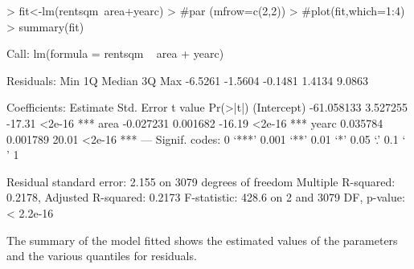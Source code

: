 \documentclass[12pt]{article}
\begin{document}
\begin{Schunk}
\begin{Sinput}
> fit<-lm(rentsqm~area+yearc)
> #par (mfrow=c(2,2))
> #plot(fit,which=1:4)
> summary(fit)
\end{Sinput}
\begin{Soutput}
Call:
lm(formula = rentsqm ~ area + yearc)

Residuals:
    Min      1Q  Median      3Q     Max 
-6.5261 -1.5604 -0.1481  1.4134  9.0863 

Coefficients:
              Estimate Std. Error t value Pr(>|t|)    
(Intercept) -61.058133   3.527255  -17.31   <2e-16 ***
area         -0.027231   0.001682  -16.19   <2e-16 ***
yearc         0.035784   0.001789   20.01   <2e-16 ***
---
Signif. codes:  0 ‘***’ 0.001 ‘**’ 0.01 ‘*’ 0.05 ‘.’ 0.1 ‘ ’ 1 

Residual standard error: 2.155 on 3079 degrees of freedom
Multiple R-squared: 0.2178,	Adjusted R-squared: 0.2173 
F-statistic: 428.6 on 2 and 3079 DF,  p-value: < 2.2e-16 
\end{Soutput}
\end{Schunk}

The summary of the model fitted shows the estimated values of the parameters and the various quantiles for residuals. 
\end{document}
